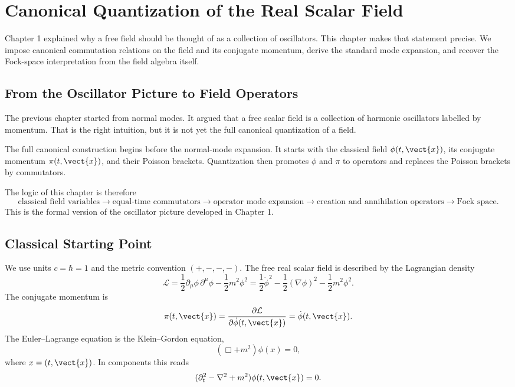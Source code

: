 \chapter{Canonical Quantization of the Real Scalar Field}

\begin{remarkbox}
Chapter 1 explained why a free field should be thought of as a collection of
oscillators. This chapter makes that statement precise. We impose canonical
commutation relations on the field and its conjugate momentum, derive the
standard mode expansion, and recover the Fock-space interpretation from the
field algebra itself.
\end{remarkbox}

\section{From the Oscillator Picture to Field Operators}

The previous chapter started from normal modes. It argued that a free scalar
field is a collection of harmonic oscillators labelled by momentum. That is the
right intuition, but it is not yet the full canonical quantization of a field.

The full canonical construction begins before the normal-mode expansion. It
starts with the classical field \(\phi(t,\vect{x})\), its conjugate momentum
\(\pi(t,\vect{x})\), and their Poisson brackets. Quantization then promotes
\(\phi\) and \(\pi\) to operators and replaces the Poisson brackets by
commutators.

The logic of this chapter is therefore
\[
    \text{classical field variables}
    \longrightarrow
    \text{equal-time commutators}
    \longrightarrow
    \text{operator mode expansion}
    \longrightarrow
    \text{creation and annihilation operators}
    \longrightarrow
    \text{Fock space}.
\]
This is the formal version of the oscillator picture developed in Chapter 1.

\section{Classical Starting Point}

We use units \(c=\hbar=1\) and the metric convention \((+,-,-,-)\). The free
real scalar field is described by the Lagrangian density
\[
    \mathcal{L}
    = \frac{1}{2}\partial_\mu\phi\,\partial^\mu\phi
      - \frac{1}{2}m^2\phi^2
    = \frac{1}{2}\dot\phi^2
      - \frac{1}{2}(\nabla\phi)^2
      - \frac{1}{2}m^2\phi^2.
\]
The conjugate momentum is
\[
    \pi(t,\vect{x})
    = \frac{\partial\mathcal{L}}{\partial\dot\phi(t,\vect{x})}
    = \dot\phi(t,\vect{x}).
\]
The Euler--Lagrange equation is the Klein--Gordon equation,
\[
    (\Box+m^2)\phi(x)=0,
\]
where \(x=(t,\vect{x})\). In components this reads
\[
    (\partial_t^2-\nabla^2+m^2)\phi(t,\vect{x})=0.
\]

